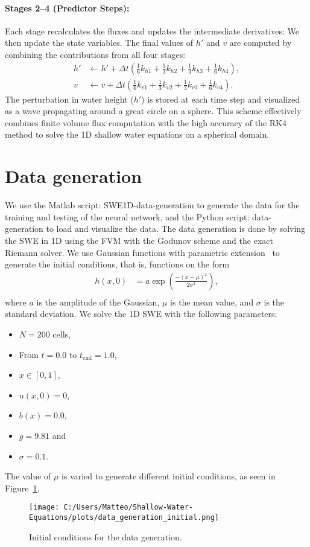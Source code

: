 \paragraph{Stages 2--4 (Predictor Steps):}
Each stage recalculates the fluxes and updates the intermediate derivatives:
We then update the state variables.
The final values of \(h'\) and \(v\) are computed by combining the contributions from all four stages:
\begin{align}
    h' &\gets h' + \Delta t \left( \frac{1}{6} k_{h1} + \frac{1}{3} k_{h2} + \frac{1}{3} k_{h3} + \frac{1}{6} k_{h4} \right), \\
    v &\gets v + \Delta t \left( \frac{1}{6} k_{v1} + \frac{1}{3} k_{v2} + \frac{1}{3} k_{v3} + \frac{1}{6} k_{v4} \right).
\end{align}
The perturbation in water height (\(h'\)) is stored at each time step and visualized as a wave propagating around a great circle on a sphere.
This scheme effectively combines finite volume flux computation with the high accuracy of the RK4 method to solve the 1D shallow water equations on a spherical domain.






\section{Data generation}
We use the Matlab script: SWE1D-data-generation to generate the data for the training and testing of the neural network, and the Python script: data-generation to load and visualize the data.
The data generation is done by solving the SWE in 1D using the FVM with the Godunov scheme and the exact Riemann solver.
We use Gaussian functions with parametric extension~\cite{Gaussian} to generate the initial conditions, that is, functions on the form
\begin{align*}
    h(x,0) &= a \exp{\left(\frac{-{(x-\mu)}^2}{2\sigma^2}\right)}, \\
\end{align*}
where $a$ is the amplitude of the Gaussian, $\mu$ is the mean value, and $\sigma$ is the standard deviation.
We solve the 1D SWE with the following parameters:
\begin{itemize}
    \item $N = 200$ cells,
    \item From $t = 0.0$ to $t_{\text{end}} = 1.0$,
    \item $x \in [0, 1]$,
    \item $u(x,0) = 0$,
    \item $b(x) = 0.0$,
    \item $g = 9.81$ and
    \item $\sigma = 0.1$.
\end{itemize}
The value of $\mu$ is varied to generate different initial conditions, as seen in Figure~\ref{fig:data_generation_initial}.
\begin{figure}[H]
    \centering
    \texttt{[image: C:/Users/Matteo/Shallow-Water-Equations/plots/data\_generation\_initial.png]}
    \caption{Initial conditions for the data generation.}\label{fig:data_generation_initial}
\end{figure}


